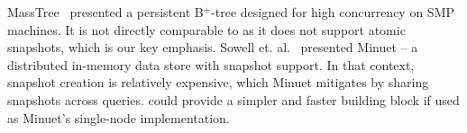 MassTree~\cite{Mao:2012} presented a persistent B$^{+}$-tree designed for high concurrency on SMP 
machines. It is not directly comparable to {\kiwi} as it does not support atomic snapshots, which is our key emphasis. 
Sowell et. al.~\cite{Sowell:2012} presented Minuet -- a distributed in-memory data store with snapshot support. 
In that context, snapshot creation is relatively expensive, which Minuet mitigates by sharing snapshots across queries. 
{\kiwi} could provide a simpler and faster building block if used as Minuet's single-node implementation. 



